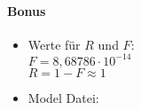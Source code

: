 \documentclass{scrartcl}
\begin{document}
\begin{enumerate}[label=Q\arabic*:]
\paragraph{Bonus}
\begin{itemize}
\item Werte für $R$ und $F$:\\
$F=8,68786\cdot 10^{-14}$\\
$R=1-F\approx1$
\item Model Datei:

\end{itemize}
\end{enumerate}
\end{document}
